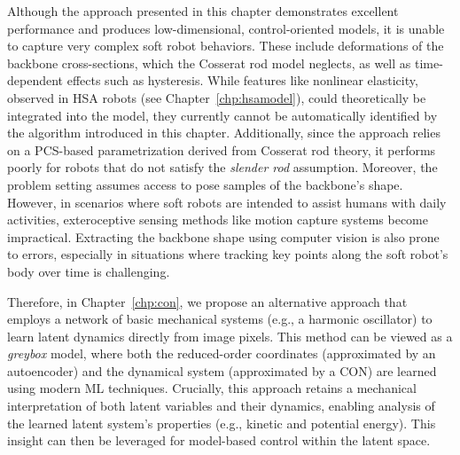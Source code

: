 Although the approach presented in this chapter demonstrates excellent performance and produces low-dimensional, control-oriented models, it is unable to capture very complex soft robot behaviors. These include deformations of the backbone cross-sections, which the Cosserat rod model neglects, as well as time-dependent effects such as hysteresis. While features like nonlinear elasticity, observed in \gls{HSA} robots (see Chapter~\ref{chp:hsamodel}), could theoretically be integrated into the model, they currently cannot be automatically identified by the algorithm introduced in this chapter.
Additionally, since the approach relies on a \gls{PCS}-based parametrization derived from Cosserat rod theory, it performs poorly for robots that do not satisfy the \emph{slender rod} assumption. Moreover, the problem setting assumes access to pose samples of the backbone’s shape. However, in scenarios where soft robots are intended to assist humans with daily activities, exteroceptive sensing methods like motion capture systems become impractical. Extracting the backbone shape using computer vision is also prone to errors, especially in situations where tracking key points along the soft robot’s body over time is challenging. 

Therefore, in Chapter~\ref{chp:con}, we propose an alternative approach that employs a network of basic mechanical systems (e.g., a harmonic oscillator) to learn latent dynamics directly from image pixels. This method can be viewed as a \emph{greybox} model, where both the reduced-order coordinates (approximated by an autoencoder) and the dynamical system (approximated by a \gls{CON}) are learned using modern \gls{ML} techniques. Crucially, this approach retains a mechanical interpretation of both latent variables and their dynamics, enabling analysis of the learned latent system’s properties (e.g., kinetic and potential energy). This insight can then be leveraged for model-based control within the latent space.